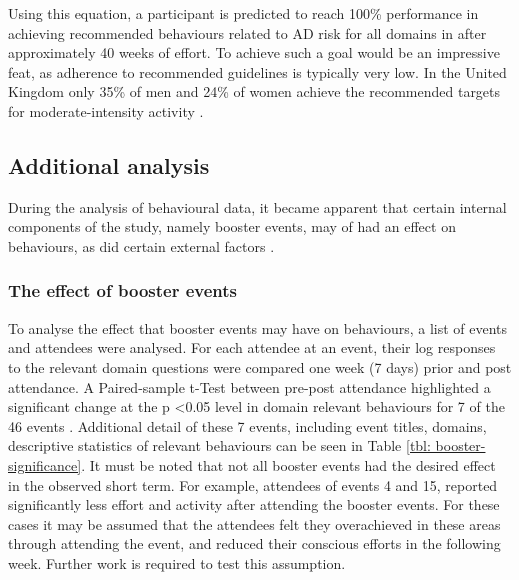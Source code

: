 Using this equation, a participant is predicted to reach 100\% performance in achieving recommended behaviours related to AD risk for all domains in after approximately 40 weeks of effort. To achieve such a goal would be an impressive feat, as adherence to recommended guidelines is typically very low. In the United Kingdom only 35\% of men and 24\% of women achieve the recommended targets for moderate-intensity activity \cite{Miles2007}.

\subsection{Additional analysis}
During the analysis of behavioural data, it became apparent that certain internal components of the study, namely booster events, may of had an effect on behaviours, as did certain external factors \cite{Hartin2015-ICOST}.

\subsubsection{The effect of booster events}
To analyse the effect that booster events may have on behaviours, a list of events and attendees were analysed. For each attendee at an event, their log responses to the relevant domain questions were compared one week (7 days) prior and post attendance. A Paired-sample t-Test between pre-post attendance highlighted a significant change at the p \textless 0.05 level in domain relevant behaviours for 7 of the 46 events \cite{Hartin2015-ICOST}. Additional detail of these 7 events, including event titles, domains, descriptive statistics of relevant behaviours can be seen in Table \ref{tbl: booster-significance}. It must be noted that not all booster events had the desired effect in the observed short term. For example, attendees of events 4 and 15, reported significantly less effort and activity after attending the booster events. For these cases it may be assumed that the attendees felt they overachieved in these areas through attending the event, and reduced their conscious efforts in the following week. Further work is required to test this assumption.

